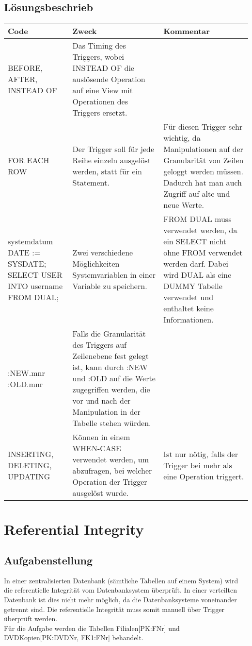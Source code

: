 \documentclass[a4paper,10pt,titlepage=false]{scrreprt}
\begin{document}
\begin{itemize}
\subsection{Lösungsbeschrieb}
\begin{tabular}{| p{5cm} | p{5cm} | p{5cm} |}
\hline
Code & Zweck & Kommentar\\ \hline
BEFORE, AFTER, INSTEAD OF & Das Timing des Triggers, wobei INSTEAD OF die auslösende Operation auf eine View mit Operationen des Triggers ersetzt.&\\ \hline
FOR EACH ROW & Der Trigger soll für jede Reihe einzeln ausgelöst werden, statt für ein Statement. & Für diesen Trigger sehr wichtig, da Manipulationen auf der Granularität von Zeilen geloggt werden müssen. Dadurch hat man auch Zugriff auf alte und neue Werte.\\ \hline
systemdatum DATE := SYSDATE;\newline
SELECT USER INTO username FROM DUAL; & Zwei verschiedene Möglichkeiten Systemvariablen in einer Variable zu speichern. & FROM DUAL muss verwendet werden, da ein SELECT nicht ohne FROM verwendet werden darf. Dabei wird DUAL als eine DUMMY Tabelle verwendet und enthaltet keine Informationen.\\ \hline
:NEW.mnr\newline
:OLD.mnr & Falls die Granularität des Triggers auf Zeilenebene fest gelegt ist, kann durch :NEW und :OLD auf die Werte zugegriffen werden, die vor und nach der Manipulation in der Tabelle stehen würden.&\\ \hline
INSERTING, DELETING, UPDATING & Können in einem WHEN-CASE verwendet werden, um abzufragen, bei welcher Operation der Trigger ausgelöst wurde. & Ist nur nötig, falls der Trigger bei mehr als eine Operation triggert.\\ \hline
\end{tabular}
\section{Referential Integrity}
\subsection{Aufgabenstellung}
In einer zentralisierten Datenbank (sämtliche Tabellen auf einem System) wird die referentielle Integrität vom Datenbanksystem überprüft. In einer verteilten Datenbank ist dies nicht mehr möglich, da die Datenbanksysteme voneinander getrennt sind. Die referentielle Integrität muss somit manuell über Trigger überprüft werden.\\
Für die Aufgabe werden die Tabellen Filialen[PK:FNr] und DVDKopien[PK:DVDNr, FK1:FNr] behandelt.

\end{itemize}
\end{document}
